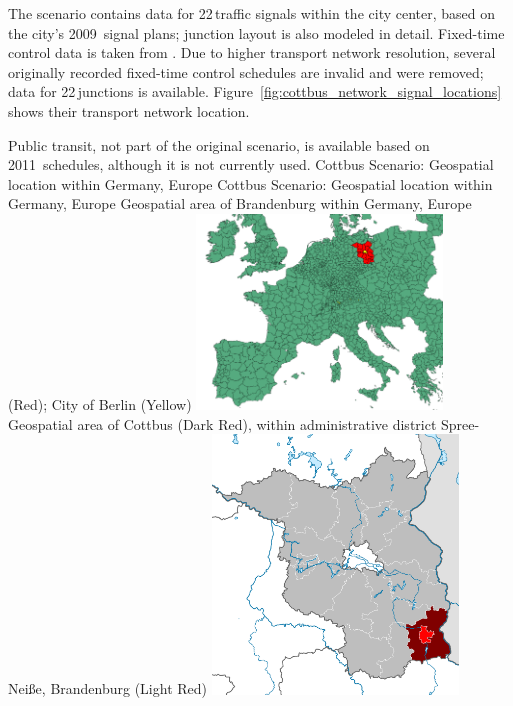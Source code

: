 The scenario contains data for 22\,traffic signals within the city center, based on the city's 2009~signal plans; junction layout is also modeled in detail. Fixed-time control data is taken from \citet{KoehlerStrehler2010SignalDemandOptimization}.  
Due to higher transport network resolution, several originally recorded fixed-time control schedules are invalid and were removed; data for 22\,junctions is available. 
Figure~\ref{fig:cottbus_network_signal_locations} shows their transport network location.  

Public transit, not part of the original scenario, is available based on 2011~schedules, although it is not currently used. 
\createfigure%
{Cottbus Scenario: Geospatial location within Germany, Europe}%
{Cottbus Scenario: Geospatial location within Germany, Europe}%
{\label{fig:scenarios:cottbus_location}}%
{%
  \createsubfigure%
	{Geospatial area of Brandenburg within Germany, Europe (Red); City of Berlin (Yellow)}
	{\includegraphics[width=0.49\textwidth]{./using/figures/brandenburg_europe.png}}
	{\label{fig:scenarios:cottbus_brandenburg_europe}}
  \createsubfigure%
	{Geospatial area of Cottbus (Dark Red), within administrative district Spree-Neiße, Brandenburg (Light Red)}
	{\includegraphics[width=0.49\textwidth]{./using/figures/brandenburg_spree_neise_cottbus.pdf}}
	{\label{fig:scenarios:cottbus_bb}}
}%
{\citet{Grether2014PhD}}

